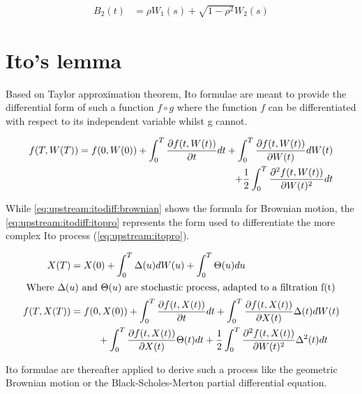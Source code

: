 \documentclass[12pt,a4paper]{report}
\begin{document}
\begin{align}
B_2(t) &= \rho W_1(s) + \sqrt{1 - \rho^2} W_2(s) \label{eq:upstream:brownian:corr:deterministic:2}
\end{align}


\section{Ito's lemma}
\label{sec:upstream:ito}

Based on Taylor approximation theorem, Ito formulae are meant to provide the differential form of such a function $f \circ g$ where the function $f$ can be differentiated with respect to its independent variable whilst g cannot.

\begin{align}
  f(T, W(T)) = f(0, W(0))
               + \int_0^T \frac{\partial f(t, W(t))}{\partial t} dt
               + \int_0^T \frac{\partial f(t, W(t))}{\partial W(t)} dW(t)\notag\\
    \mspace{150mu} + \frac{1}{2} \int_0^T \frac{\partial^2 f(t, W(t))}{\partial W(t)^2} dt \label{eq:upstream:itodiff:brownian}
\end{align}

While \cref{eq:upstream:itodiff:brownian} shows the formula for Brownian motion, the \cref{eq:upstream:itodiff:itopro} represents the form used to differentiate the more complex Ito process (\ref{eq:upstream:itopro}).

\begin{align}
  X(T) &= X(0)
         + \int_0^T \Delta(u) dW(u)
         + \int_0^T \Theta(u) du \label{eq:upstream:itopro} \\
  \intertext{
  Where $\Delta(u)$ and $\Theta(u)$ are stochastic process, adapted to a filtration f(t)
  }
  f(T, X(T)) &= f(0, X(0))
               + \int_0^T \frac{\partial f(t, X(t))}{\partial t} dt
               + \int_0^T \frac{\partial f(t, X(t))}{\partial X(t)} \Delta(t) dW(t)\notag\\
    &\mspace{50mu} + \int_0^T \frac{\partial f(t, X(t))}{\partial X(t)} \Theta(t) dt
    + \frac{1}{2} \int_0^T \frac{\partial^2 f(t, X(t))}{\partial W(t)^2} \Delta^2(t)dt \label{eq:upstream:itodiff:itopro}
\end{align}

Ito formulae are thereafter applied to derive such a process like the geometric Brownian motion or the Black-Scholes-Merton partial differential equation. 
\end{document}
